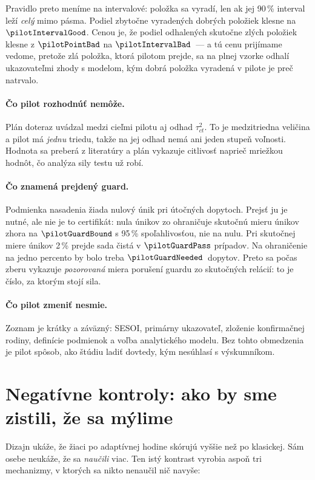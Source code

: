 Pravidlo preto meníme na intervalové: položka sa vyradí, len ak jej 90\,\% interval leží \emph{celý} mimo pásma. Podiel zbytočne vyradených dobrých položiek klesne na $\pilotIntervalGood$. Cenou je, že podiel odhalených skutočne zlých položiek klesne z $\pilotPointBad$ na $\pilotIntervalBad$~--- a tú cenu prijímame vedome, pretože zlá položka, ktorá pilotom prejde, sa na plnej vzorke odhalí ukazovateľmi zhody s modelom, kým dobrá položka vyradená v pilote je preč natrvalo.

\paragraph{Čo pilot rozhodnúť nemôže.} Plán doteraz uvádzal medzi cieľmi pilotu aj odhad $\tau^2_{ct}$. To je medzitriedna veličina a pilot má \emph{jednu} triedu, takže na jej odhad nemá ani jeden stupeň voľnosti. Hodnota sa preberá z literatúry a plán vykazuje citlivosť naprieč mriežkou hodnôt, čo analýza sily testu už robí.

\paragraph{Čo znamená prejdený guard.} Podmienka nasadenia žiada nulový únik pri \pilotGuardN{} útočných dopytoch. Prejsť ju je nutné, ale nie je to certifikát: nula únikov zo \pilotGuardN{} ohraničuje skutočnú mieru únikov zhora na $\pilotGuardBound$ s 95\,\% spoľahlivosťou, nie na nulu. Pri skutočnej miere únikov 2\,\% prejde sada čistá v $\pilotGuardPass$ prípadov. Na ohraničenie na jedno percento by bolo treba $\pilotGuardNeeded$~dopytov. Preto sa počas zberu vykazuje \emph{pozorovaná} miera porušení guardu zo skutočných relácií: to je číslo, za ktorým stojí sila.

\paragraph{Čo pilot zmeniť nesmie.} Zoznam je krátky a záväzný: SESOI, primárny ukazovateľ, zloženie konfirmačnej rodiny, definície podmienok a voľba analytického modelu. Bez tohto obmedzenia je pilot spôsob, ako štúdiu ladiť dovtedy, kým nesúhlasí s výskumníkom.

\section{Negatívne kontroly: ako by sme zistili, že sa mýlime}
\label{sec:negativne-kontroly}

Dizajn ukáže, že žiaci po adaptívnej hodine skórujú vyššie než po klasickej. Sám osebe neukáže, že sa \emph{naučili} viac. Ten istý kontrast vyrobia aspoň tri mechanizmy, v ktorých sa nikto nenaučil nič navyše:


